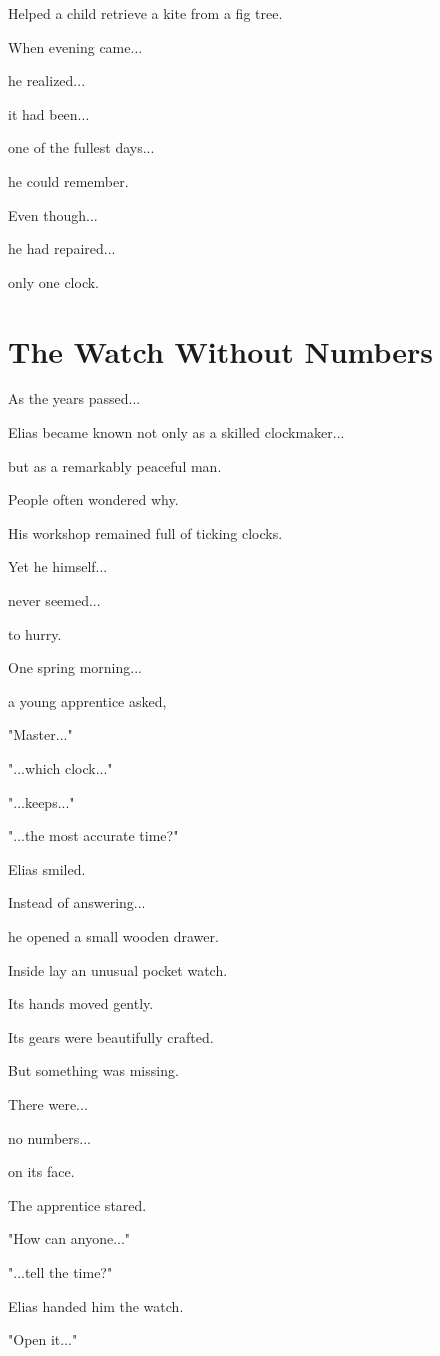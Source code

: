 \documentclass[12pt,openany]{book}
\begin{document}
Helped a child retrieve a kite from a fig tree.

When evening came...

he realized...

it had been...

one of the fullest days...

he could remember.

Even though...

he had repaired...

only one clock.
\section*{The Watch Without Numbers}

As the years passed...

Elias became known not only as a skilled clockmaker...

but as a remarkably peaceful man.

People often wondered why.

His workshop remained full of ticking clocks.

Yet he himself...

never seemed...

to hurry.

One spring morning...

a young apprentice asked,

"Master..."

"...which clock..."

"...keeps..."

"...the most accurate time?"

Elias smiled.

Instead of answering...

he opened a small wooden drawer.

Inside lay an unusual pocket watch.

Its hands moved gently.

Its gears were beautifully crafted.

But something was missing.

There were...

no numbers...

on its face.

The apprentice stared.

"How can anyone..."

"...tell the time?"

Elias handed him the watch.

"Open it..."
\end{document}
